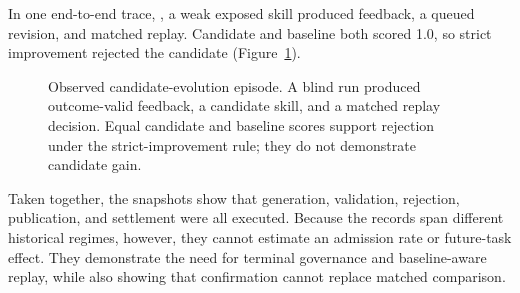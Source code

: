 \documentclass[11pt]{article}
\begin{document}
In one end-to-end trace, , a weak exposed skill
produced feedback, a queued revision, and matched replay.  Candidate and baseline both
scored 1.0, so strict improvement rejected the candidate (Figure~\ref{fig:candidate_episode}).

\begin{figure}[H]
\centering
{}
\caption{Observed candidate-evolution episode.  A blind run produced outcome-valid
feedback, a candidate skill, and a matched replay decision.  Equal candidate and baseline
scores support rejection under the strict-improvement rule; they do not demonstrate
candidate gain.}
\label{fig:candidate_episode}
\end{figure}

Taken together, the snapshots show that generation, validation, rejection, publication,
and settlement were all executed.  Because the records span different historical
regimes, however, they cannot estimate an admission rate or future-task effect.  They
demonstrate the need for terminal governance and baseline-aware replay, while also
showing that confirmation cannot replace matched comparison.
\end{document}

